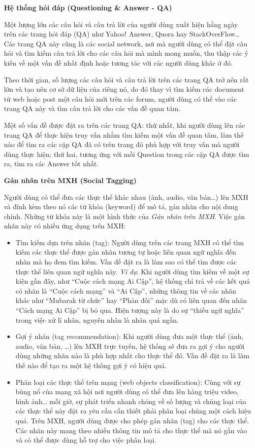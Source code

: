 \documentclass[12pt]{extarticle}
\begin{document}
			\par \textbf{Hệ thống hỏi đáp (Questioning \& Answer - QA)}
			\par Một lượng lớn các câu hỏi và câu trả lời của người dùng xuất hiện hằng ngày trên các trang hỏi đáp (QA) như Yahoo! Answer, Quora hay StackOverFlow… Các trang QA này cũng là các social network, nơi mà người dùng có thể đặt câu hỏi và tìm kiếm câu trả lời cho các câu hỏi mà mình mong muốn, thu thập các ý kiến về một vấn đề nhất định hoặc tương tác với các người dùng khác ở đó. 
			\par Theo thời gian, số lượng các câu hỏi và câu trả lời trên các trang QA trở nên rất lớn và tạo nên cơ sở dữ liệu của riêng nó, do đó thay vì tìm kiếm các document từ web hoặc post một câu hỏi mới trên các forum, người dùng có thể vào các trang QA này và tìm câu trả lời cho các vấn đề quan tâm.
			\par Một số vấn đề được đặt ra trên các trang QA: thứ nhất, khi người dùng lên các trang QA để thực hiện truy vấn nhằm tìm kiếm một vấn đề quan tâm, làm thế nào để tìm ra các cặp QA đã có trên trang đó phù hợp với truy vấn mà người dùng thực hiện; thứ hai, tương ứng với mỗi Question trong các cặp QA được tìm ra, tìm ra các Answer tốt nhất.
			\par \textbf{Gán nhãn trên MXH (Social Tagging)}
			\par Người dùng có thể đưa các thực thể khác nhau (ảnh, audio, văn bản…) lên MXH và đính kèm theo nó các từ khóa (keyword) để mô tả, gán nhãn cho nội dung chính. Những từ khóa này là một hình thức của \textit{Gán nhãn trên MXH}. Việc gán nhãn này có nhiều ứng dụng trên MXH:
			\begin{itemize}
				\item Tìm kiếm dựa trên nhãn (tag): Người dùng trên các trang MXH có thể tìm kiếm các thực thể được gán nhãn tương tự hoặc liên quan ngữ nghĩa đến nhãn mà họ đem tìm kiếm. Vấn đề đặt ra là làm sao có thể tìm được các thực thể liên quan ngữ nghĩa này. \textit{Ví dụ}: Khi người dùng tìm kiếm về một sự kiện gần đây, như “Cuộc cách mạng  Ai Cập”, hệ thống chỉ trả về các kết quả có nhãn là “Cuộc cách mạng” và “Ai Cập”, những thông tin về các nhãn khác như “Mubarak từ chức” hay “Phản đối” mặc dù có liên quan đến nhãn “Cách mạng Ai Cập” bị bỏ qua. Hiện tượng này là do sự “thiếu ngữ nghĩa” trong việc xử lí nhãn, nguyên nhân là nhãn quá ngắn.
				\item Gợi ý nhãn (tag recommendation): Khi người dùng đưa một thực thể (ảnh, audio, văn bản, …) lên MXH trực tuyến, hệ thống sẽ đưa ra gợi ý cho người dùng những nhãn nào là phù hợp nhất cho thực thể đó. Vấn đề đặt ra là làm thế nào để tạo ra một hệ thống gợi ý có hiệu quả.   
				\item Phân loại các thực thể trên mạng (web objects classification): Cùng với sự bùng nổ của mạng xã hội nơi người dùng có thể đưa lên hàng triệu video, hình ảnh… mỗi giờ, sự phát triển nhanh chóng về số lượng và chủng loại của các thực thể này đặt ra yêu cầu cần thiết phải phân loại chúng một cách hiệu quả. Trên MXH, người dùng được cho phép gán nhãn (tag) cho các thực thể. Các nhãn này mang theo nhiều thông tin mô tả cho thực thể mà nó gắn vào và có thể được dùng hỗ trợ cho việc phân loại.
			\end{itemize}
\end{document}
